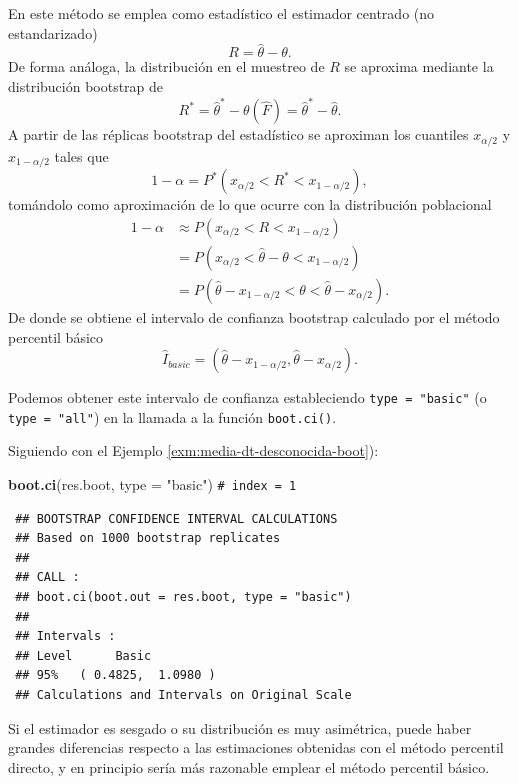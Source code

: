 \documentclass[
  spanish,
  10pt,
]{book}
\newenvironment{Shaded}{\begin{snugshade}}{\end{snugshade}}
\newcommand{\AttributeTok}[1]{\textcolor[rgb]{0.13,0.29,0.53}{#1}}
\newcommand{\CommentTok}[1]{\textcolor[rgb]{0.56,0.35,0.01}{\textit{#1}}}
\newcommand{\FunctionTok}[1]{\textcolor[rgb]{0.13,0.29,0.53}{\textbf{#1}}}
\newcommand{\NormalTok}[1]{#1}
\newcommand{\StringTok}[1]{\textcolor[rgb]{0.31,0.60,0.02}{#1}}
\theoremstyle{break}
\theoremstyle{nonumberplain}
\renewcommand{\CommentTok}[1]{\textcolor[rgb]{0.41,0.41,0.41}{\texttt{#1}}}
\begin{document}
En este método se emplea como estadístico el estimador centrado (no estandarizado)
\[R = \hat{\theta}-\theta.\]
De forma análoga, la distribución en el muestreo de \(R\) se aproxima mediante la distribución bootstrap de
\[R^{\ast}= \hat{\theta}^{\ast}-\theta \left( \hat{F} \right) = \hat{\theta}^{\ast}-\hat{\theta}.\]
A partir de las réplicas bootstrap del estadístico se aproximan los cuantiles \(x_{\alpha /2}\) y \(x_{1-\alpha /2}\) tales que
\[1-\alpha = P^{\ast}\left( x_{\alpha /2}<R^{\ast}<x_{1-\alpha /2} \right),\]
tomándolo como aproximación de lo que ocurre con la distribución poblacional
\[\begin{aligned}
1-\alpha &\approx P\left( x_{\alpha /2}<R<x_{1-\alpha /2} \right) \\
&= P\left( x_{\alpha /2} < \hat{\theta}-\theta < x_{1-\alpha /2} \right) \\
&= P\left( \hat{\theta} - x_{1-\alpha /2} < \theta <\hat{\theta} -x_{\alpha /2} \right).
\end{aligned}\]
De donde se obtiene el intervalo de confianza bootstrap calculado
por el método percentil básico
\[\hat{I}_{basic}=\left( \hat{\theta} - x_{1-\alpha /2},\hat{\theta} - x_{\alpha /2} \right).\]

Podemos obtener este intervalo de confianza estableciendo \texttt{type\ =\ "basic"} (o \texttt{type\ =\ "all"}) en la llamada a la función \texttt{boot.ci()}.

Siguiendo con el Ejemplo \ref{exm:media-dt-desconocida-boot}):

\begin{Shaded}
\begin{Highlighting}[]
\FunctionTok{boot.ci}\NormalTok{(res.boot, }\AttributeTok{type =} \StringTok{"basic"}\NormalTok{) }\CommentTok{\# index = 1}
\end{Highlighting}
\end{Shaded}

\begin{verbatim}
 ## BOOTSTRAP CONFIDENCE INTERVAL CALCULATIONS
 ## Based on 1000 bootstrap replicates
 ## 
 ## CALL : 
 ## boot.ci(boot.out = res.boot, type = "basic")
 ## 
 ## Intervals : 
 ## Level      Basic         
 ## 95%   ( 0.4825,  1.0980 )  
 ## Calculations and Intervals on Original Scale
\end{verbatim}

Si el estimador es sesgado o su distribución es muy asimétrica, puede haber grandes diferencias respecto a las estimaciones obtenidas con el método percentil directo, y en principio sería más razonable emplear el método percentil básico.
\end{document}
